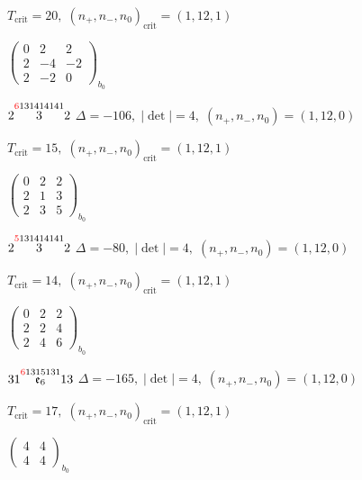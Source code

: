 \documentclass[10pt]{article}
\begin{document}
\hspace{1em}$T_{\text{crit}}=20,\; (n_+,n_-,n_0)_{\text{crit}}=(1,12,1)$

\hspace{2em}$\left(\begin{smallmatrix}0 & 2 & 2 \\ 2 & -4 & -2 \\ 2 & -2 & 0\end{smallmatrix}\right)_{\!b_0}$

\smallskip

$2\overset{\textcolor{red}{6}131414141}{3}2$ \quad $\Delta=-106,\; |\det|=4,\; (n_+,n_-,n_0)=(1,12,0)$

\hspace{1em}$T_{\text{crit}}=15,\; (n_+,n_-,n_0)_{\text{crit}}=(1,12,1)$

\hspace{2em}$\left(\begin{smallmatrix}0 & 2 & 2 \\ 2 & 1 & 3 \\ 2 & 3 & 5\end{smallmatrix}\right)_{\!b_0}$

$2\overset{\textcolor{red}{5}131414141}{3}2$ \quad $\Delta=-80,\; |\det|=4,\; (n_+,n_-,n_0)=(1,12,0)$

\hspace{1em}$T_{\text{crit}}=14,\; (n_+,n_-,n_0)_{\text{crit}}=(1,12,1)$

\hspace{2em}$\left(\begin{smallmatrix}0 & 2 & 2 \\ 2 & 2 & 4 \\ 2 & 4 & 6\end{smallmatrix}\right)_{\!b_0}$

\smallskip

$31\overset{\textcolor{red}{6}1315131}{\mathfrak{e}_6}13$ \quad $\Delta=-165,\; |\det|=4,\; (n_+,n_-,n_0)=(1,12,0)$

\hspace{1em}$T_{\text{crit}}=17,\; (n_+,n_-,n_0)_{\text{crit}}=(1,12,1)$

\hspace{2em}$\left(\begin{smallmatrix}4 & 4 \\ 4 & 4\end{smallmatrix}\right)_{\!b_0}$
\end{document}
